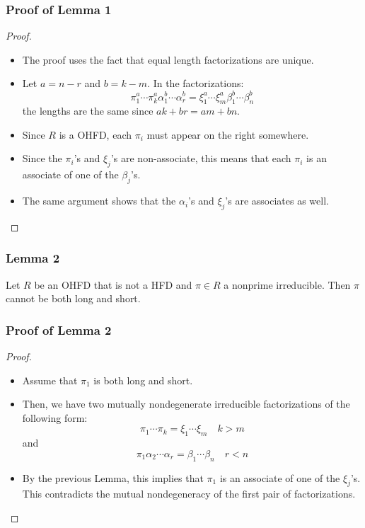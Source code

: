 \begin{frame}
  \frametitle{Proof of Lemma 1}
  \begin{proof}
    \begin{itemize}
      \item <1->The proof uses the fact that equal length factorizations are unique.
      \item <2->Let $a = n-r$ and $b = k - m$. In the factorizations:
	  $$\pi_1^a\cdots\pi_k^a\alpha_1^b\cdots\alpha_r^b=\xi_1^a\cdots\xi_m^a\beta_1^b\cdots\beta_n^b$$
	the lengths are the same since $ak+br=am+bn$. 
      \item <3->
	Since $R$ is a OHFD, each $\pi_i$ must appear on the right somewhere.
      \item<4->
	Since the $\pi_i$'s and $\xi_j$'s are non-associate, this means that each $\pi_i$ is an associate of one of the $\beta_j$'s. 
      \item<5->The same argument shows that the $\alpha_i$'s and $\xi_j$'s are associates as well.
    \end{itemize}
  \end{proof}
\end{frame}

\begin{frame}
  \frametitle{Lemma 2}
  \begin{lemma}
    Let $R$ be an OHFD that is not a HFD and $\pi \in R$ a nonprime irreducible.
    Then $\pi$ cannot be both long and short.
  \end{lemma}
\end{frame}

\begin{frame}
  \frametitle{Proof of Lemma 2}
  \begin{proof}
    \begin{itemize}
      \item <1->Assume that $\pi_1$ is both long and short.
      \item <2->Then, we have two mutually nondegenerate irreducible factorizations of the following form:
	  $$\pi_1\cdots\pi_k=\xi_1\cdots\xi_m \quad k > m$$
	and
	  $$\pi_1\alpha_2\cdots\alpha_r=\beta_1\cdots\beta_n \quad r < n$$
      \item <3->By the previous Lemma, this implies that $\pi_1$ is an associate of one of the $\xi_j$'s.
	This contradicts the mutual nondegeneracy of the first pair of factorizations.
    \end{itemize}
  \end{proof}
\end{frame}

